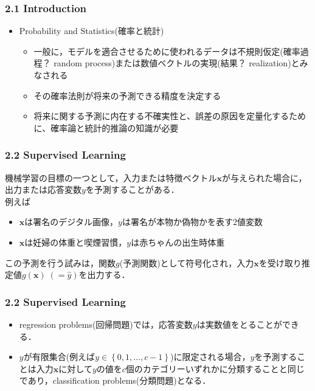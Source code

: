 \documentclass[dvipdfmx,cjk]{beamer}
\theoremstyle{example}
\begin{document}
\begin{frame}
    \frametitle{2.1 Introduction}
    \begin{itemize}
        \item Probability and Statistics(確率と統計)
              \begin{itemize}
                  \item 一般に，モデルを適合させるために使われるデータは不規則仮定(確率過程？ random process)または数値ベクトルの実現(結果？ realization)とみなされる
                  \item その確率法則が将来の予測できる精度を決定する
                  \item 将来に関する予測に内在する不確実性と、誤差の原因を定量化するために、確率論と統計的推論の知識が必要
              \end{itemize}
    \end{itemize}
\end{frame}

\begin{frame}
    \frametitle{2.2 Supervised Learning}
    機械学習の目標の一つとして，入力または特徴ベクトル$\boldsymbol{x}$が与えられた場合に，出力または応答変数$y$を予測することがある．\\
    例えば
    \begin{itemize}
        \item $\boldsymbol{x}$は署名のデジタル画像，$y$は署名が本物か偽物かを表す2値変数
        \item $\boldsymbol{x}$は妊婦の体重と喫煙習慣，$y$は赤ちゃんの出生時体重
    \end{itemize}
    この予測を行う試みは，関数$g$(予測関数)として符号化され，入力$\boldsymbol{x}$を受け取り推定値$g(\boldsymbol{x})\;(=\hat{y})$を出力する．
\end{frame}

\begin{frame}
    \frametitle{2.2 Supervised Learning}
    \begin{itemize}
        \item regression problems(回帰問題)では，応答変数$y$は実数値をとることができる．
        \item $y$が有限集合(例えば$y\in\left\{0,1,\dots,c-1\right\}$)に限定される場合，$y$を予測することは入力$\boldsymbol{x}$に対して$y$の値を$c$個のカテゴリーいずれかに分類することと同じであり，classification problems(分類問題)となる．
    \end{itemize}
\end{frame}
\end{document}
